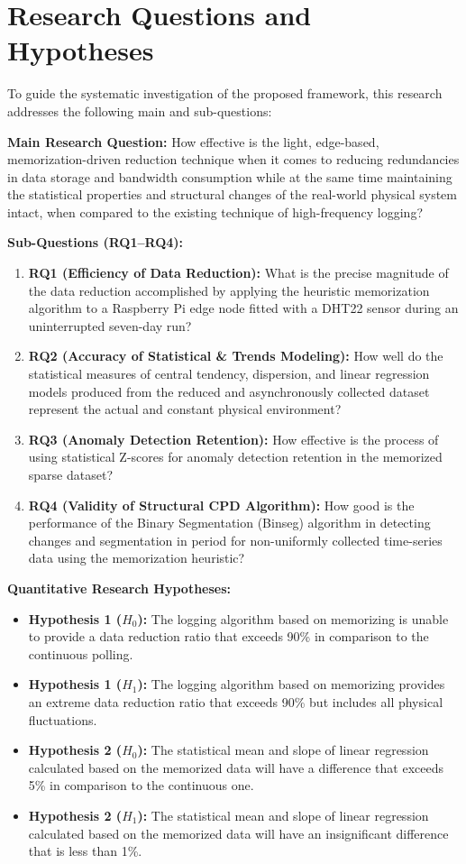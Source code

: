 \section{Research Questions and Hypotheses}
To guide the systematic investigation of the proposed framework, this research addresses the following main and sub-questions:

\textbf{Main Research Question:}
How effective is the light, edge-based, memorization-driven reduction technique when it comes to reducing redundancies in data storage and bandwidth consumption while at the same time maintaining the statistical properties and structural changes of the real-world physical system intact, when compared to the existing technique of high-frequency logging?

\textbf{Sub-Questions (RQ1--RQ4):}
\begin{enumerate}
   \item \textbf{RQ1 (Efficiency of Data Reduction):} What is the precise magnitude of the data reduction accomplished by applying the heuristic memorization algorithm to a Raspberry Pi edge node fitted with a DHT22 sensor during an uninterrupted seven-day run?
    \item \textbf{RQ2 (Accuracy of Statistical \& Trends Modeling):} How well do the statistical measures of central tendency, dispersion, and linear regression models produced from the reduced and asynchronously collected dataset represent the actual and constant physical environment?
    \item \textbf{RQ3 (Anomaly Detection Retention):} How effective is the process of using statistical Z-scores for anomaly detection retention in the memorized sparse dataset?
    \item \textbf{RQ4 (Validity of Structural CPD Algorithm):} How good is the performance of the Binary Segmentation (Binseg) algorithm in detecting changes and segmentation in period for non-uniformly collected time-series data using the memorization heuristic?
\end{enumerate}

\textbf{Quantitative Research Hypotheses:}
\begin{itemize}
\item \textbf{Hypothesis 1 ($H_0$):} The logging algorithm based on memorizing is unable to provide a data reduction ratio that exceeds 90\% in comparison to the continuous polling.
    \item \textbf{Hypothesis 1 ($H_1$):} The logging algorithm based on memorizing provides an extreme data reduction ratio that exceeds 90\% but includes all physical fluctuations.
    \item \textbf{Hypothesis 2 ($H_0$):} The statistical mean and slope of linear regression calculated based on the memorized data will have a difference that exceeds 5\% in comparison to the continuous one.
    \item \textbf{Hypothesis 2 ($H_1$):} The statistical mean and slope of linear regression calculated based on the memorized data will have an insignificant difference that is less than 1\%.
\end{itemize}

